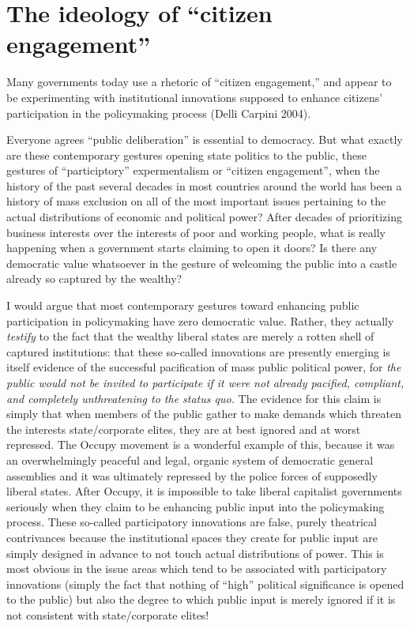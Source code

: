 \documentclass[12pt,book]{article}
\begin{document}
\section{The ideology of ``citizen
engagement''}\label{the-ideology-of-citizen-engagement}

Many governments today use a rhetoric of ``citizen engagement,'' and
appear to be experimenting with institutional innovations supposed to
enhance citizens' participation in the policymaking process (Delli
Carpini 2004).

Everyone agrees ``public deliberation'' is essential to democracy. But
what exactly are these contemporary gestures opening state politics to
the public, these gestures of ``participtory'' expermentalism or
``citizen engagement'', when the history of the past several decades in
most countries around the world has been a history of mass exclusion on
all of the most important issues pertaining to the actual distributions
of economic and political power? After decades of prioritizing business
interests over the interests of poor and working people, what is really
happening when a government starts claiming to open it doors? Is there
any democratic value whatsoever in the gesture of welcoming the public
into a castle already so captured by the wealthy?

I would argue that most contemporary gestures toward enhancing public
participation in policymaking have zero democratic value. Rather, they
actually \emph{testify} to the fact that the wealthy liberal states are
merely a rotten shell of captured institutions: that these so-called
innovations are presently emerging is itself evidence of the successful
pacification of mass public political power, for \emph{the public would
not be invited to participate if it were not already pacified,
compliant, and completely unthreatening to the status quo.} The evidence
for this claim is simply that when members of the public gather to make
demands which threaten the interests state/corporate elites, they are at
best ignored and at worst repressed. The Occupy movement is a wonderful
example of this, because it was an overwhelmingly peaceful and legal,
organic system of democratic general assemblies and it was ultimately
repressed by the police forces of supposedly liberal states. After
Occupy, it is impossible to take liberal capitalist governments
seriously when they claim to be enhancing public input into the
policymaking process. These so-called participatory innovations are
false, purely theatrical contrivances because the institutional spaces
they create for public input are simply designed in advance to not touch
actual distributions of power. This is most obvious in the issue areas
which tend to be associated with participatory innovations (simply the
fact that nothing of ``high'' political significance is opened to the
public) but also the degree to which public input is merely ignored if
it is not consistent with state/corporate elites!
\end{document}
